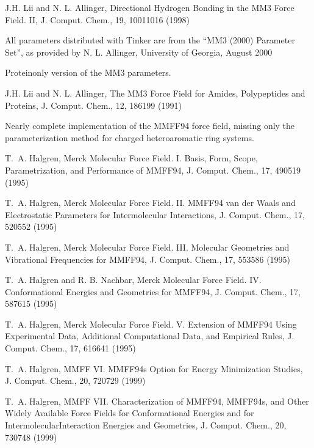 \documentclass[letterpaper,11pt,english]{sphinxmanual}
\begin{document}
\sphinxAtStartPar
J.\sphinxhyphen{}H. Lii and N. L. Allinger, Directional Hydrogen Bonding in the MM3 Force Field. II, J. Comput. Chem., 19, 1001\sphinxhyphen{}1016 (1998)

\sphinxAtStartPar
All parameters distributed with Tinker are from the “MM3 (2000) Parameter Set”, as provided by N. L. Allinger, University of Georgia, August 2000

\sphinxAtStartPar
{}

\sphinxAtStartPar
Protein\sphinxhyphen{}only version of the MM3 parameters.

\sphinxAtStartPar
J.\sphinxhyphen{}H. Lii and N. L. Allinger, The MM3 Force Field for Amides, Polypeptides and Proteins, J. Comput. Chem., 12, 186\sphinxhyphen{}199 (1991)

\sphinxAtStartPar
{}

\sphinxAtStartPar
Nearly complete implementation of the MMFF94 force field, missing only the parameterization method for charged heteroaromatic ring systems.

\sphinxAtStartPar
T. A. Halgren, Merck Molecular Force Field. I. Basis, Form, Scope, Parametrization, and Performance of MMFF94, J. Comput. Chem., 17, 490\sphinxhyphen{}519 (1995)

\sphinxAtStartPar
T. A. Halgren, Merck Molecular Force Field. II. MMFF94 van der Waals and Electrostatic Parameters for Intermolecular Interactions, J. Comput. Chem., 17, 520\sphinxhyphen{}552 (1995)

\sphinxAtStartPar
T. A. Halgren, Merck Molecular Force Field. III. Molecular Geometries and Vibrational Frequencies for MMFF94, J. Comput. Chem., 17, 553\sphinxhyphen{}586 (1995)

\sphinxAtStartPar
T. A. Halgren and R. B. Nachbar, Merck Molecular Force Field. IV. Conformational Energies and Geometries for MMFF94, J. Comput. Chem., 17, 587\sphinxhyphen{}615 (1995)

\sphinxAtStartPar
T. A. Halgren, Merck Molecular Force Field. V. Extension of MMFF94 Using Experimental Data, Additional Computational Data, and Empirical Rules, J. Comput. Chem., 17, 616\sphinxhyphen{}641 (1995)

\sphinxAtStartPar
T. A. Halgren, MMFF VI. MMFF94s Option for Energy Minimization Studies, J. Comput. Chem., 20, 720\sphinxhyphen{}729 (1999)

\sphinxAtStartPar
T. A. Halgren, MMFF VII. Characterization of MMFF94, MMFF94s, and Other Widely Available Force Fields for Conformational Energies and for Intermolecular\sphinxhyphen{}Interaction Energies and Geometries, J. Comput. Chem., 20, 730\sphinxhyphen{}748 (1999)
\end{document}
